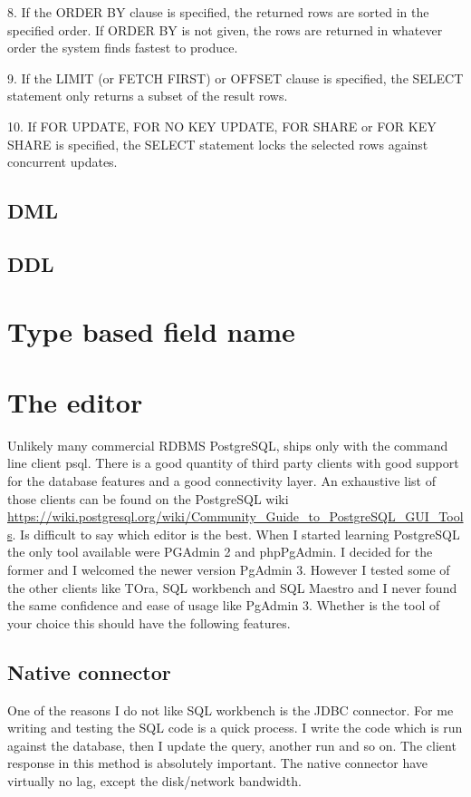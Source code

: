 \begin{itemize}
\begin{smallverbatim}
8. If the ORDER BY clause is specified, the returned rows are sorted in the specified order. 
If ORDER BY is not given, the rows are returned in whatever order the system finds fastest to produce. 


9. If the LIMIT (or FETCH FIRST) or OFFSET clause is specified, the SELECT statement only returns 
a subset of the result rows. 

10. If FOR UPDATE, FOR NO KEY UPDATE, FOR SHARE or FOR KEY SHARE is specified, 
the SELECT statement locks the selected rows against concurrent updates. 

\end{smallverbatim}



\subsection{DML}

\subsection{DDL}

\section{Type based field name}


\section{The editor}
Unlikely many commercial RDBMS PostgreSQL, ships only with the command line client psql. There is a 
good quantity of third party clients with good support for the database features and a good connectivity 
layer. An exhaustive list of those clients can be found on the PostgreSQL wiki\newline
\href{https://wiki.postgresql.org/wiki/Community\_Guide\_to\_PostgreSQL\_GUI\_Tools}{
https://wiki.postgresql.org/wiki/Community\_Guide\_to\_PostgreSQL\_GUI\_Tools}. Is difficult to say 
which editor is the best. When I started learning PostgreSQL the only tool available were PGAdmin 2 and 
phpPgAdmin. I decided for the former and I welcomed the newer version PgAdmin 3. However I tested some of 
the other clients like TOra, SQL workbench and SQL Maestro and I never found the same confidence and ease 
of usage like PgAdmin 3. Whether is the tool of your choice this should have the following features.

\subsection{Native connector}
One of the reasons I do not like SQL workbench is the JDBC connector. For me writing and testing the SQL 
code is a quick process. I write the code which is run against the database, then I update the query, 
another run and so on. The client response in this method is absolutely important. The native connector 
have virtually no lag, except the disk/network bandwidth.


\end{itemize}
